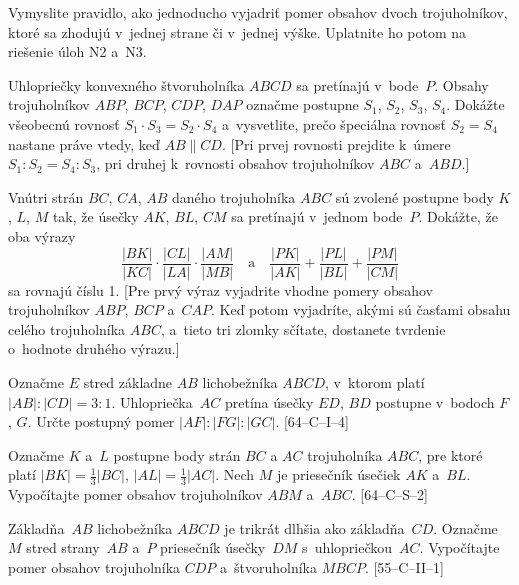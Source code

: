{
Vymyslite pravidlo, ako jednoducho vyjadriť pomer obsahov dvoch
trojuholníkov, ktoré sa zhodujú v~jednej strane či v~jednej výške.
Uplatnite ho potom na riešenie úloh N2 a~N3.

Uhlopriečky konvexného štvoruholníka $ABCD$ sa pretínajú
v~bode~$P$. Obsahy trojuholníkov $ABP$, $BCP$, $CDP$, $DAP$ označme postupne
$S_1$, $S_2$, $S_3$, $S_4$. Dokážte všeobecnú rovnosť $S_1\cdot
S_3=S_2\cdot S_4$ a~vysvetlite, prečo špeciálna rovnosť $S_2=S_4$
nastane práve vtedy, keď $AB\parallel CD$. [Pri prvej rovnosti prejdite
k~úmere $S_1:S_2=S_4:S_3$, pri druhej k~rovnosti obsahov trojuholníkov
$ABC$ a~$ABD$.]

Vnútri strán $BC$, $CA$, $AB$ daného trojuholníka $ABC$ sú zvolené
postupne body $K$, $L$, $M$ tak, že úsečky $AK$, $BL$, $CM$ sa
pretínajú v~jednom bode~$P$. Dokážte, že oba výrazy
$$
\frac{|BK|}{|KC|}\cdot\frac{|CL|}{|LA|}\cdot\frac{|AM|}{|MB|}\quad
\text{a}\quad
\frac{|PK|}{|AK|}+\frac{|PL|}{|BL|}+\frac{|PM|}{|CM|}
$$
sa rovnajú číslu 1.
[Pre prvý výraz vyjadrite vhodne pomery obsahov trojuholníkov $ABP$, $BCP$
a~$CAP$. Keď potom vyjadríte, akými sú časťami obsahu celého trojuholníka $ABC$,
a~tieto tri zlomky sčítate, dostanete tvrdenie o~hodnote druhého výrazu.]

\D
Označme $E$ stred základne $AB$ lichobežníka $ABCD$, v~ktorom platí
$|AB|:|CD|={3:1}$. Uhlopriečka~$AC$ pretína úsečky $ED$, $BD$ postupne
v~bodoch $F$, $ G$. Určte postupný pomer
$|AF|:|FG|:|GC|$. [64--C--I--4]

Označme $K$ a~$L$ postupne body strán $BC$ a $AC$ trojuholníka $ABC$,
pre ktoré platí $|BK|=\frac13|BC|$, $|AL|=\frac13|AC|$. Nech $M$ je
priesečník úsečiek $AK$ a~$BL$. Vypočítajte pomer obsahov trojuholníkov
$ABM$ a~$ABC$. [64--C--S--2]

Základňa~$AB$ lichobežníka $ABCD$ je trikrát dlhšia ako
základňa~$CD$. Označme $M$ stred strany~$AB$ a~$P$ priesečník
úsečky~$DM$ s~uhlopriečkou~$AC$. Vypočítajte pomer obsahov
trojuholníka $CDP$ a~štvoruholníka $MBCP$. [55--C--II--1]
}

